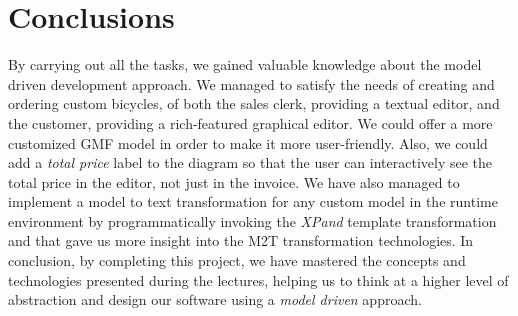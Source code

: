 \section{Conclusions}
\label{sec.conclusions}
\noindent By carrying out all the tasks, we gained valuable knowledge about
the model driven development approach. We managed to satisfy the needs of creating
and ordering custom bicycles, of both the sales clerk, providing a textual
editor, and the customer, providing a rich-featured graphical editor. We could
offer a more customized GMF model in order to make it more user-friendly. Also,
we could add a \emph{total price} label to the diagram so that the user can
interactively see the total price in the editor, not just in the invoice. We
have also managed to implement a model to text transformation for any custom model in the runtime
environment by programmatically invoking the \emph{XPand} template
transformation and that gave us more insight into the M2T transformation technologies. In
conclusion, by completing this project, we have mastered the concepts and
technologies presented during the lectures, helping us to think at a higher
level of abstraction and design our software using a \emph{model driven}
approach.
